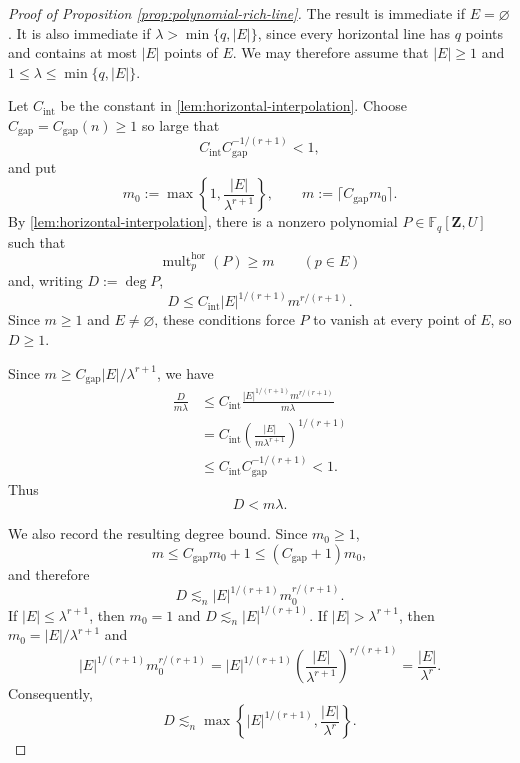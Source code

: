 \documentclass[11pt,letterpaper]{amsart}
\numberwithin{equation}{section}
\theoremstyle{definition}
\theoremstyle{remark}
\newcommand{\Fq}{\mathbb F_q}
\begin{document}
\begin{proof}[Proof of Proposition \ref{prop:polynomial-rich-line}]
The result is immediate if $E=\varnothing$. It is also
immediate if $\lambda>\min\{q,|E|\}$, since every horizontal line has $q$ points and contains at most $|E|$ points of $E$. We may therefore assume that $|E|\geq1$ and $1\leq\lambda\leq\min\{q,|E|\}$.


Let $C_{\mathrm{int}}$ be the constant in \cref{lem:horizontal-interpolation}. Choose $C_{\mathrm{gap}}=C_{\mathrm{gap}}(n)\geq1$ so large that
\begin{equation}\label{eq:multiplicity-gap-constant}
 C_{\mathrm{int}}C_{\mathrm{gap}}^{-1/(r+1)}<1,
\end{equation}
and put
\[
 m_0
 :=
 \max\left\{1,\frac{|E|}{\lambda^{r+1}}\right\},
 \qquad
 m:=\lceil C_{\mathrm{gap}}m_0\rceil.
\]
By \cref{lem:horizontal-interpolation}, there is a nonzero polynomial $P\in\Fq[\mathbf Z,U]$ such that
\begin{equation}\label{eq:interpolating-multiplicity}
 \operatorname{mult}^{\mathrm{hor}}_p(P)\geq m
 \qquad(p\in E)
\end{equation}
and, writing $D:=\deg P$,
\begin{equation}\label{eq:initial-rich-polynomial-degree}
 D
 \leq
 C_{\mathrm{int}}|E|^{1/(r+1)}m^{r/(r+1)}.
\end{equation}
Since $m\geq1$ and $E\neq\varnothing$, these conditions force $P$ to vanish at every point of $E$, so $D\geq1$.

Since $m\geq C_{\mathrm{gap}}|E|/\lambda^{r+1}$, we have
\begin{align*}
 \frac{D}{m\lambda}
 &\leq
 C_{\mathrm{int}}\frac{|E|^{1/(r+1)}m^{r/(r+1)}}{m\lambda}\\
 &=C_{\mathrm{int}}\left(\frac{|E|}{m\lambda^{r+1}}\right)^{1/(r+1)}\\
 &\leq C_{\mathrm{int}}C_{\mathrm{gap}}^{-1/(r+1)}
 <1.
\end{align*}
Thus
\begin{equation}\label{eq:degree-multiplicity-gap}
 D<m\lambda.
\end{equation}

We also record the resulting degree bound. Since $m_0\geq1$,
\[
 m\leq C_{\mathrm{gap}}m_0+1\leq(C_{\mathrm{gap}}+1)m_0,
\]
and therefore
\[
 D\lesssim_n |E|^{1/(r+1)}m_0^{r/(r+1)}.
\]
If $|E|\leq\lambda^{r+1}$, then $m_0=1$ and
$D\lesssim_n|E|^{1/(r+1)}$. If $|E|>\lambda^{r+1}$, then
$m_0=|E|/\lambda^{r+1}$ and
\[
 |E|^{1/(r+1)}m_0^{r/(r+1)}
 =
 |E|^{1/(r+1)}
 \left(\frac{|E|}{\lambda^{r+1}}\right)^{r/(r+1)}
 =
 \frac{|E|}{\lambda^r}.
\]
Consequently,
\begin{equation}\label{eq:final-rich-polynomial-degree}
 D
 \lesssim_n
 \max\left\{|E|^{1/(r+1)},\frac{|E|}{\lambda^r}\right\}.
\end{equation}



\end{proof}
\end{document}
